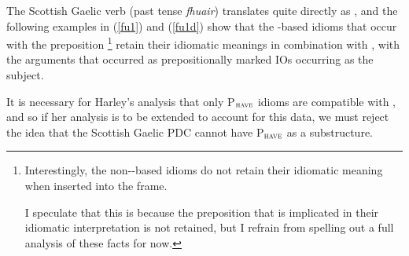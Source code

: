 \documentclass[output=paper,colorlinks,citecolor=brown]{langscibook}
\begin{document}


\noindent The Scottish Gaelic verb  (past tense \textit{fhuair}) translates quite directly as , and the following examples in (\ref{fu1}) and (\ref{fu1d}) show that the -based idioms that  occur with the preposition \footnote{Interestingly, the non--based idioms do not retain their idiomatic meaning when inserted into the  frame. 


\noindent I speculate that this is because the preposition that is implicated in their idiomatic interpretation is not retained, but I refrain from spelling out a full analysis of these facts for now. } retain their idiomatic meanings in combination with , with the arguments that occurred as prepositionally marked IOs occurring as the subject. 



\noindent It is necessary for Harley's analysis that only P$_{\textsc{have}}$ idioms are compatible with , and so if her analysis is to be extended to account for this data, we must reject the idea that the Scottish Gaelic PDC cannot have P$_{\textsc{have}}$ as a substructure. 
\end{document}
